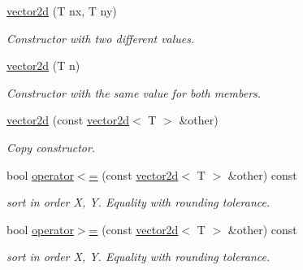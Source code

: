 \begin{DoxyCompactItemize}
\hyperlink{classirr_1_1core_1_1vector2d_addeb85b77b2f8372609330c66ffe53b0}{vector2d} (T nx, T ny)
\begin{DoxyCompactList}\small\item\em Constructor with two different values. \end{DoxyCompactList}\item 
\mbox{\label{classirr_1_1core_1_1vector2d_a88a082b80dbf6b5c221e5086fbade7e5}} 
\hyperlink{classirr_1_1core_1_1vector2d_a88a082b80dbf6b5c221e5086fbade7e5}{vector2d} (T n)
\begin{DoxyCompactList}\small\item\em Constructor with the same value for both members. \end{DoxyCompactList}\item 
\mbox{\label{classirr_1_1core_1_1vector2d_a8ebd20ef37425d42120c13aabdf63298}} 
\hyperlink{classirr_1_1core_1_1vector2d_a8ebd20ef37425d42120c13aabdf63298}{vector2d} (const \hyperlink{classirr_1_1core_1_1vector2d}{vector2d}$<$ T $>$ \&other)
\begin{DoxyCompactList}\small\item\em Copy constructor. \end{DoxyCompactList}\item 
\mbox{\label{classirr_1_1core_1_1vector2d_ac6489831d99a69de7bcaf11033f39cbb}} 
bool \hyperlink{classirr_1_1core_1_1vector2d_ac6489831d99a69de7bcaf11033f39cbb}{operator$<$=} (const \hyperlink{classirr_1_1core_1_1vector2d}{vector2d}$<$ T $>$ \&other) const
\begin{DoxyCompactList}\small\item\em sort in order X, Y. Equality with rounding tolerance. \end{DoxyCompactList}\item 
\mbox{\label{classirr_1_1core_1_1vector2d_abb2be95a6bcf8f2e9ce22fc10c09dee5}} 
bool \hyperlink{classirr_1_1core_1_1vector2d_abb2be95a6bcf8f2e9ce22fc10c09dee5}{operator$>$=} (const \hyperlink{classirr_1_1core_1_1vector2d}{vector2d}$<$ T $>$ \&other) const
\begin{DoxyCompactList}\small\item\em sort in order X, Y. Equality with rounding tolerance. \end{DoxyCompactList}\item 

\end{DoxyCompactItemize}
